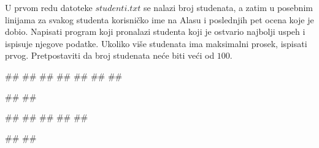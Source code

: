 \begin{Exercise}[label=p3_06] 
 U prvom redu datoteke $studenti.txt$ se nalazi broj studenata, a zatim u posebnim linijama za svakog studenta korisničko ime na Alasu i poslednjih pet ocena koje je dobio. Napisati program koji pronalazi studenta koji je ostvario najbolji uspeh i ispisuje njegove podatke. Ukoliko više studenata ima maksimalni prosek, ispisati prvog. Pretpostaviti da broj studenata neće biti veći od $100$.\\
\begin{miditest}
\begin{upotreba}{1}
##
##
##
##
##
##
##

#\naslovIzlaz#
##
\end{upotreba}
\end{miditest}
\begin{miditest}
\begin{upotreba}{2}
##
##
##
##
##

#\naslovIzlaz#
##
\end{upotreba}
\end{miditest}
\end{Exercise}
\begin{Answer}[ref=p3_06]
\end{Answer}

